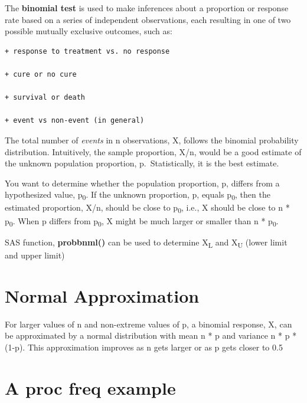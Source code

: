 \documentclass[
]{book}
\begin{document}
The \textbf{binomial test} is used to make inferences about a proportion or response
rate based on a series of independent observations, each resulting in one of two
possible mutually exclusive outcomes, such as:

\begin{verbatim}
+ response to treatment vs. no response

+ cure or no cure

+ survival or death

+ event vs non-event (in general)
\end{verbatim}

The total number of \emph{events} in n observations, X, follows the binomial probability
distribution. Intuitively, the sample proportion, X/n, would be a good estimate of
the unknown population proportion, p.~Statistically, it is the best estimate.

You want to determine whether the population proportion, p, differs from a
hypothesized value, p\textsubscript{0}. If the unknown proportion, p, equals p\textsubscript{0}, then the estimated proportion, X/n,
should be close to p\textsubscript{0}, i.e., X should be close to n * p\textsubscript{0}. When p differs from p\textsubscript{0},
X might be much larger or smaller than n * p\textsubscript{0}.

SAS function, \textbf{probbnml()} can be used to determine X\textsubscript{L} and X\textsubscript{U} (lower limit and
upper limit)

\hypertarget{normal-approximation}{%
\section{Normal Approximation}\label{normal-approximation}}

For larger values of n and non-extreme values of p, a binomial response, X, can be
approximated by a normal distribution with mean n * p and variance n * p * (1-p). This
approximation improves as n gets larger or as p gets closer to 0.5

\hypertarget{a-proc-freq-example}{%
\section{A proc freq example}\label{a-proc-freq-example}}
\end{document}
